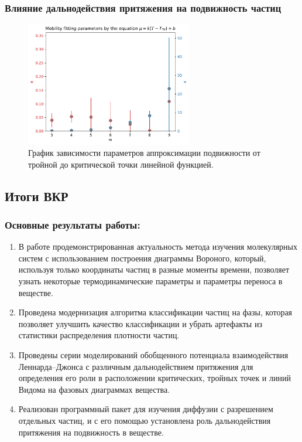 \documentclass[pdf,hyperref={unicode}]{beamer}
\begin{document}
\begin{frame}
\transdissolve[duration=0.2]
\frametitle{Влияние дальнодействия притяжения на подвижность частиц}

\begin{figure}[h]
\begin{center}
\includegraphics[width=0.65\textwidth]{mobility_fitting_factors}
\caption{\small График зависимости параметров аппроксимации подвижности от тройной до критической точки линейной функцией.}
\label{risFittingFactors}
\end{center}
\end{figure}

\end{frame}





\subsection{Итоги ВКР}


\begin{frame}
	\transdissolve[duration=0.2]
	\frametitle{Основные результаты работы:}
	\footnotesize{
\begin{enumerate}
    \item В работе продемонстрированная актуальность метода изучения молекулярных систем с использованием построения диаграммы Вороного, который, используя только координаты частиц в разные моменты времени, позволяет узнать некоторые термодинамические параметры и параметры переноса в веществе.
    \item Проведена модернизация алгоритма классификации частиц на фазы, которая позволяет улучшить качество классификации и убрать артефакты из статистики распределения плотности частиц.
    \item Проведены серии моделирований обобщенного потенциала взаимодействия Леннарда--Джонса с различным дальнодействием притяжения для определения его роли в расположении критических, тройных точек и линий Видома на фазовых диаграммах вещества. 
    \item Реализован программный пакет для изучения диффузии с разрешением отдельных частиц, и с его помощью установлена роль дальнодействия притяжения на подвижность в веществе. 
\end{enumerate}
	}
\end{frame}
\end{document}
